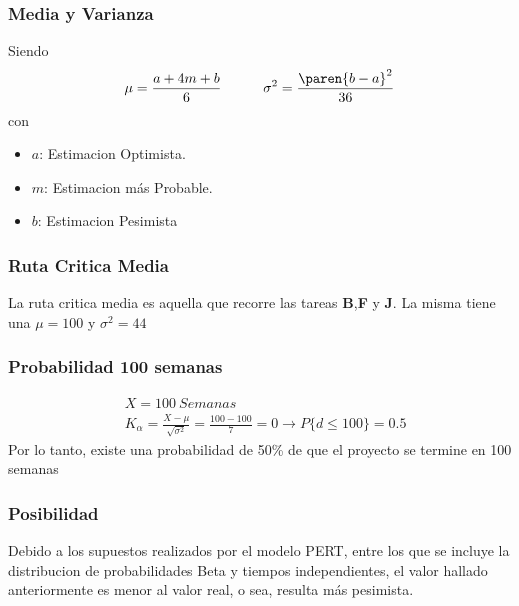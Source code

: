 \begin{homeworkProblem}
\subsubsection{Media y Varianza}
Siendo
\begin{align*}
    \mu=\frac{a+4m+b}{6} \quad\quad\quad \sigma^2=\frac{\paren{b-a}^2}{36}  
\end{align*}
con 
\begin{itemize}
    \item $a$: Estimacion Optimista.
    \item $m$: Estimacion más Probable. 
    \item $b$: Estimacion Pesimista
\end{itemize}
\subsubsection{Ruta Critica Media}
La ruta critica media es aquella que recorre las tareas \textbf{B},\textbf{F} y \textbf{J}. La misma tiene una $\mu=100$ y $\sigma^2=44$
\subsubsection{Probabilidad 100 semanas}
\begin{align*}
    &X = 100\ Semanas  \\
   &K_{\alpha} = \frac{X-\mu}{\sqrt{\sigma^2}}=\frac{100-100}{7}=0\rightarrow P\{d\leq100\}=0.5 
\end{align*}
Por lo tanto, existe una probabilidad de 50\% de que el proyecto se termine en 100 semanas
\subsubsection{Posibilidad}
Debido a los supuestos realizados por el modelo PERT, entre los que se incluye la distribucion de probabilidades Beta y tiempos independientes, el valor hallado anteriormente es menor al valor real, o sea, resulta más pesimista.
\end{homeworkProblem}